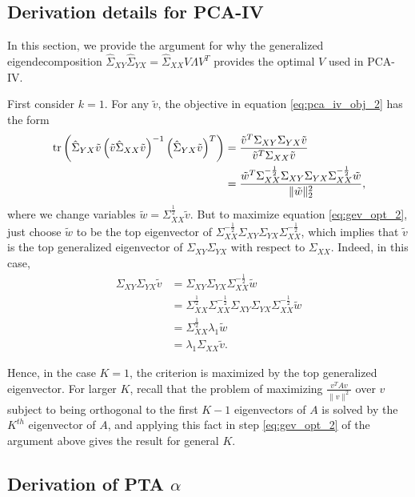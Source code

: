 \documentclass[14pt]{extarticle}
\begin{document}
\subsection{Derivation details for PCA-IV}
\label{subsec:pca_iv_derivation}

In this section, we provide the argument for why the generalized
eigendecomposition $\hat{\Sigma}_{XY}\hat{\Sigma}_{YX} =
\hat{\Sigma}_{XX}V\Lambda V^{T}$ provides the optimal $V$ used in PCA-IV.

First consider $k = 1$. For any $\tilde{v}$, the objective
in equation \ref{eq:pca_iv_obj_2} has the form
\begin{align}
  \mathop\mathrm{tr}\left(\hat{\Sigma}_{YX}\tilde{v}\left(\tilde{v}\hat{\Sigma}_{XX}\tilde{v}\right)^{-1}
  \left(\hat{\Sigma}_{YX}\tilde{v}\right)^{T}\right) &=
  \frac{\tilde{v}^{T}\Sigma_{XY}\Sigma_{YX}\tilde{v}}{\tilde{v}^{T}\Sigma_{XX}\tilde{v}} \nonumber \\
  &= \frac{\tilde{w}^{T}\Sigma_{XX}^{-\frac{1}{2}}\Sigma_{XY}\Sigma_{YX}\Sigma_{XX}^{-\frac{1}{2}}\tilde{w}}{\|\tilde{w}\|_{2}^{2}}, \label{eq:gev_opt_2}
\end{align}
where we change variables $\tilde{w} = \Sigma_{XX}^{\frac{1}{2}}\tilde{v}$. But
to maximize equation \ref{eq:gev_opt_2}, just choose $\tilde{w}$ to be the top
eigenvector of
$\Sigma_{XX}^{-\frac{1}{2}}\Sigma_{XY}\Sigma_{YX}\Sigma_{XX}^{-\frac{1}{2}}$,
which implies that $\tilde{v}$ is the top generalized eigenvector of
$\Sigma_{XY}\Sigma_{YX}$ with respect to $\Sigma_{XX}$. Indeed, in this case,
\begin{align*}
  \Sigma_{XY}\Sigma_{YX}\tilde{v}
  &=\Sigma_{XY}\Sigma_{YX}\Sigma_{XX}^{-\frac{1}{2}}\tilde{w} \\
  &= \Sigma_{XX}^{\frac{1}{2}} \Sigma_{XX}^{-\frac{1}{2}}\Sigma_{XY}\Sigma_{YX} \Sigma_{XX}^{-\frac{1}{2}}\tilde{w}\\
  &= \Sigma_{XX}^{\frac{1}{2}}\lambda_{1}\tilde{w} \\
  &= \lambda_{1}\Sigma_{XX}\tilde{v}.
\end{align*}

Hence, in the case $K = 1$, the criterion is maximized by the top generalized
eigenvector. For larger $K$, recall that the problem of maximizing
$\frac{v^{T}Av}{\|v\|^{2}}$ over $v$ subject to being orthogonal to the first $K
- 1$ eigenvectors of $A$ is solved by the $K^{th}$ eigenvector of $A$, and
applying this fact in step \ref{eq:gev_opt_2} of the argument above gives the
result for general $K$.

\subsection{Derivation of PTA $\alpha$}
\label{subsec:pta_alpha_derivation}
\end{document}
